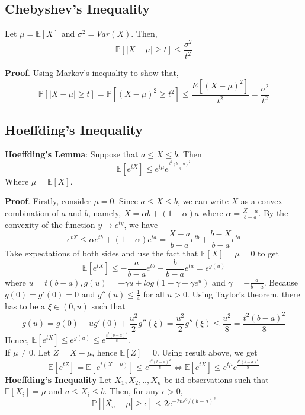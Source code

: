 \documentclass[10pt]{article}
\begin{document}
\subsection*{Chebyshev's Inequality}
Let $\mu = \mathbb{E}[X] $ and $\sigma^2 = Var(X)$. Then,
\[ \mathbb{P}[|X-\mu| \geqslant t] \leqslant\frac{\sigma^2}{t^2} \]

\textbf{Proof}. Using Markov's inequality to show that,
\[ \mathbb{P}[|X-\mu| \geqslant t] = \mathbb{P}[(X-\mu)^2 \geqslant t^2] \leqslant \frac{E[(X- \mu)^2]}{t^2} = \frac{\sigma^2}{t^2} \]



\subsection*{Hoeffding's Inequality}
\textbf{Hoeffding's Lemma}: Suppose that $a\leqslant X \leqslant b$. Then
\[ \mathbb{E}[e^{tX}] \leqslant e^{t\mu}e^{\frac{t^2(b-a)^2}{8}}  \]
Where $\mu = \mathbb{E}[X]$.

\textbf{Proof}. Firstly, consider $\mu = 0$. Since $a \leqslant X \leqslant b$, we can write $X$ as a convex combination of $a$ and $b$, namely, $X = \alpha b + (1- \alpha)a$ where $\alpha = \frac{X-a}{b-a}$. By the convexity of the function $y \rightarrow e^{ty}$, we have
\[e^{tX} \leqslant \alpha e^{tb} + (1-\alpha)e^{ta} = \frac{X-a}{b-a}e^{tb} + \frac{b-X}{b-a}e^{ta} \]
Take expectations of both sides and use the fact that $\mathbb{E}[X] = \mu=0$ to get
\[ \mathbb{E}[e^{tX}] \leqslant -\frac{a}{b-a}e^{tb} + \frac{b}{b-a}e^{ta} = e^{g(u)} \]  
where $u=t(b-a), g(u)=-\gamma u + log(1-\gamma + \gamma e^u)$ and $\gamma = -\frac{a}{b-a}$. Because $g(0)=g'(0)=0$ and $g''(u) \leqslant \frac{1}{4}$ for all $u>0$. Using Taylor's theorem, there has to be a $\xi \in (0,u)$ such that
\[ g(u) = g(0) + ug'(0) + \frac{u^2}{2}g''(\xi) = \frac{u^2}{2}g''(\xi) \leqslant \frac{u^2}{8} = \frac{t^2(b-a)^2}{8} \]
Hence, $\mathbb{E}[e^{tX}] \leqslant e^{g(u)} \leqslant e^{\frac{t^2(b-a)^2}{8}}$.\\
If $\mu \neq 0$. Let $Z = X - \mu$, hence $\mathbb{E}[Z] =0$. Using result above, we get 
\[ \mathbb{E}[e^{tZ}] = \mathbb{E}[e^{t(X-\mu)}] \leqslant e^{\frac{t^2(b-a)^2}{8}} \Leftrightarrow \mathbb{E}[e^{tX}] \leqslant e^{t\mu}e^{\frac{t^2(b-a)^2}{8}} \]
\textbf{Hoeffding's Inequality} Let $X_1, X_2,..,X_n$ be iid observations such that $\mathbb{E}[X_i] = \mu$ and $a \leqslant X_i \leqslant b$. Then, for any $\epsilon > 0$,
\[ \mathbb{P}[|\bar{X_n} - \mu| \geqslant \epsilon] \leqslant 2e^{-2n\epsilon^2 / (b-a)^2} \]
\end{document}
